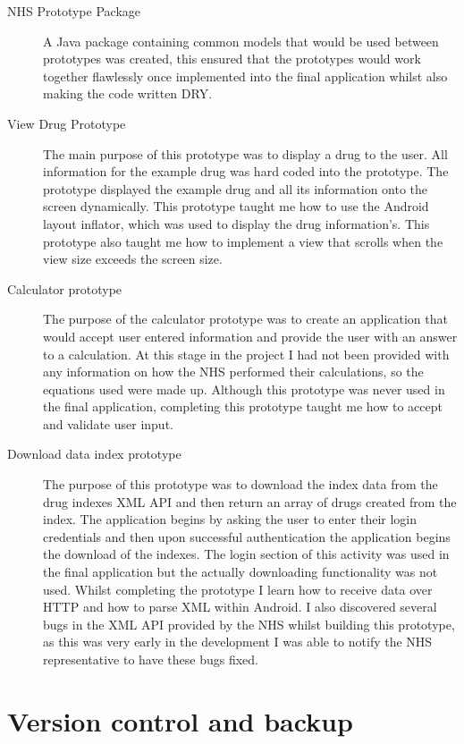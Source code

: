 \begin{description}
\item[NHS Prototype Package]
A Java \cite{java} package containing common models that would be used between prototypes was created, this ensured that the prototypes would work together flawlessly once implemented into the final application whilst also making the code written DRY.

\item[View Drug Prototype]
The main purpose of this prototype was to display a drug to the user. All information for the example drug was hard coded into the prototype. The prototype displayed the example drug and all its information onto the screen dynamically. This prototype taught me how to use the Android layout inflator, which was used to display the drug information’s. This prototype also taught me how to implement a view that scrolls when the view size exceeds the screen size.

\item[Calculator prototype]
The purpose of the calculator prototype was to create an application that would accept user entered information and provide the user with an answer to a calculation. At this stage in the project I had not been provided with any information on how the NHS performed their calculations, so the equations used were made up. Although this prototype was never used in the final application, completing this prototype taught me how to accept and validate user input.

\item[Download data index prototype]
The purpose of this prototype was to download the index data from the drug indexes XML \cite{xml} API and then return an array of drugs created from the index. The application begins by asking the user to enter their login credentials and then upon successful authentication the application begins the download of the indexes. The login section of this activity was used in the final application but the actually downloading functionality was not used. Whilst completing the prototype I learn how to receive data over HTTP and how to parse XML within Android. I also discovered several bugs in the XML API provided by the NHS whilst building this prototype, as this was very early in the development I was able to notify the NHS representative to have these bugs fixed.
\end{description}

\section{Version control and backup}


